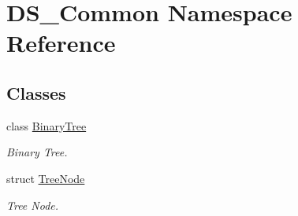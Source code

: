 \hypertarget{namespace_d_s___common}{}\section{D\+S\+\_\+\+Common Namespace Reference}
\label{namespace_d_s___common}
\subsection*{Classes}
\begin{DoxyCompactItemize}
\item 
class \mbox{\hyperlink{class_d_s___common_1_1_binary_tree}{Binary\+Tree}}
\begin{DoxyCompactList}\small\item\em Binary Tree. \end{DoxyCompactList}\item 
struct \mbox{\hyperlink{struct_d_s___common_1_1_tree_node}{Tree\+Node}}
\begin{DoxyCompactList}\small\item\em Tree Node. \end{DoxyCompactList}\end{DoxyCompactItemize}
